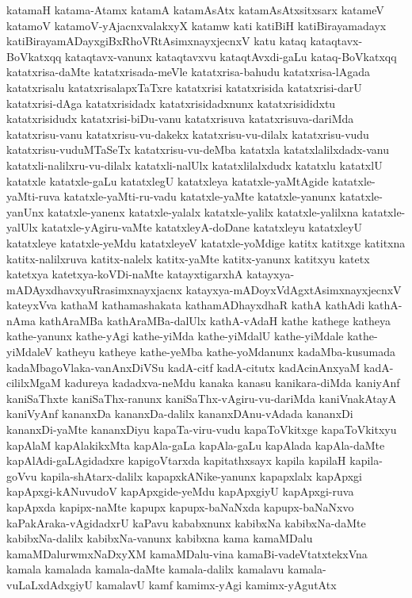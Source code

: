 {katamaH
katama-Atamx
katamA
katamAsAtx
katamAsAtxsitxsarx
katameV
katamoV
katamoV-yAjacnxvalakxyX
katamw
kati
katiBiH
katiBirayamadayx
katiBirayamADayxgiBxRhoVRtAsimxnayxjecnxV
katu
kataq
kataqtavx-BoVkatxqq
kataqtavx-vanunx
kataqtavxvu
kataqtAvxdi-gaLu
kataq-BoVkatxqq
katatxrisa-daMte
katatxrisada-meVle
katatxrisa-bahudu
katatxrisa-lAgada
katatxrisalu
katatxrisalapxTaTxre
katatxrisi
katatxrisida
katatxrisi-darU
katatxrisi-dAga
katatxrisidadx
katatxrisidadxnunx
katatxrisididxtu
katatxrisidudx
katatxrisi-biDu-vanu
katatxrisuva
katatxrisuva-dariMda
katatxrisu-vanu
katatxrisu-vu-dakekx
katatxrisu-vu-dilalx
katatxrisu-vudu
katatxrisu-vuduMTaSeTx
katatxrisu-vu-deMba
katatxla
katatxlalilxdadx-vanu
katatxli-nalilxru-vu-dilalx
katatxli-nalUlx
katatxlilalxdudx
katatxlu
katatxlU
katatxle
katatxle-gaLu
katatxlegU
katatxleya
katatxle-yaMtAgide
katatxle-yaMti-ruva
katatxle-yaMti-ru-vadu
katatxle-yaMte
katatxle-yanunx
katatxle-yanUnx
katatxle-yanenx
katatxle-yalalx
katatxle-yalilx
katatxle-yalilxna
katatxle-yalUlx
katatxle-yAgiru-vaMte
katatxleyA-doDane
katatxleyu
katatxleyU
katatxleye
katatxle-yeMdu
katatxleyeV
katatxle-yoMdige
katitx
katitxge
katitxna
katitx-nalilxruva
katitx-nalelx
katitx-yaMte
katitx-yanunx
katitxyu
katetx
katetxya
katetxya-koVDi-naMte
katayxtigarxhA
katayxya-mADAyxdhavxyuRrasimxnayxjacnx
katayxya-mADoyxVdAgxtAsimxnayxjecnxV
kateyxVva
kathaM
kathamashakata
kathamADhayxdhaR
kathA
kathAdi
kathA-nAma
kathAraMBa
kathAraMBa-dalUlx
kathA-vAdaH
kathe
kathege
katheya
kathe-yanunx
kathe-yAgi
kathe-yiMda
kathe-yiMdalU
kathe-yiMdale
kathe-yiMdaleV
katheyu
katheye
kathe-yeMba
kathe-yoMdanunx
kadaMba-kusumada
kadaMbagoVlaka-vanAnxDiVSu
kadA-citf
kadA-citutx
kadAcinAnxyaM
kadA-cililxMgaM
kadureya
kadadxva-neMdu
kanaka
kanasu
kanikara-diMda
kaniyAnf
kaniSaThxte
kaniSaThx-ranunx
kaniSaThx-vAgiru-vu-dariMda
kaniVnakAtayA
kaniVyAnf
kananxDa
kananxDa-dalilx
kananxDAnu-vAdada
kananxDi
kananxDi-yaMte
kananxDiyu
kapaTa-viru-vudu
kapaToVkitxge
kapaToVkitxyu
kapAlaM
kapAlakikxMta
kapAla-gaLa
kapAla-gaLu
kapAlada
kapAla-daMte
kapAlAdi-gaLAgidadxre
kapigoVtarxda
kapitathxsayx
kapila
kapilaH
kapila-goVvu
kapila-shAtarx-dalilx
kapapxkANike-yanunx
kapapxlalx
kapApxgi
kapApxgi-kANuvudoV
kapApxgide-yeMdu
kapApxgiyU
kapApxgi-ruva
kapApxda
kapipx-naMte
kapupx
kapupx-baNaNxda
kapupx-baNaNxvo
kaPakAraka-vAgidadxrU
kaPavu
kababxnunx
kabibxNa
kabibxNa-daMte
kabibxNa-dalilx
kabibxNa-vanunx
kabibxna
kama
kamaMDalu
kamaMDalurwmxNaDxyXM
kamaMDalu-vina
kamaBi-vadeVtatxtekxVna
kamala
kamalada
kamala-daMte
kamala-dalilx
kamalavu
kamala-vuLaLxdAdxgiyU
kamalavU
kamf
kamimx-yAgi
kamimx-yAgutAtx
}
